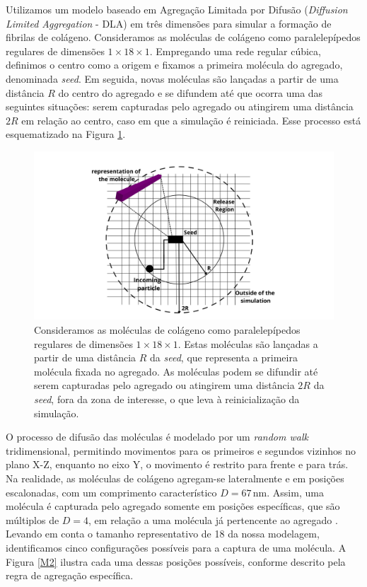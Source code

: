 \documentclass{article}
\begin{document}
    Utilizamos um modelo baseado em Agregação Limitada por Difusão (\textit{Diffusion Limited Aggregation} - DLA) \cite{Witten1983} 
    em três dimensões para simular a formação de fibrilas de colágeno. Consideramos as moléculas de colágeno como paralelepípedos 
    regulares de dimensões \(1 \times 18 \times 1\). Empregando uma rede regular cúbica, definimos o centro como a origem e fixamos 
    a primeira molécula do agregado, denominada \textit{seed}. Em seguida, novas moléculas são lançadas a partir de uma distância 
    \(R\) do centro do agregado e se difundem até que ocorra uma das seguintes situações: serem capturadas pelo agregado ou atingirem 
    uma distância \(2R\) em relação ao centro, caso em que a simulação é reiniciada. Esse processo está esquematizado na Figura \ref{M1}. 

        \begin{figure}[H]
            \centering
            \includegraphics[width=\textwidth]{figures/DLA.png}
    
            \caption{Consideramos as moléculas de colágeno como paralelepípedos regulares de dimensões \(1 \times 18 \times 1\). 
            Estas moléculas são lançadas a partir de uma distância \(R\) da \textit{seed}, que representa a primeira molécula fixada 
            no agregado. As moléculas podem se difundir até serem capturadas pelo agregado ou atingirem uma distância \(2R\) da \textit{seed}, 
            fora da zona de interesse, o que leva à reinicialização da simulação.} 
    
            \label{M1}
        \end{figure}
    
        O processo de difusão das moléculas é modelado por um \textit{random walk} tridimensional, permitindo movimentos para os primeiros e 
        segundos vizinhos no plano X-Z, enquanto no eixo Y, o movimento é restrito para frente e para trás. Na realidade, as moléculas de colágeno 
        agregam-se lateralmente e em posições escalonadas, com um comprimento característico \(D = 67 \, \text{nm}\). Assim, uma molécula é 
        capturada pelo agregado somente em posições específicas, que são múltiplos de \(D = 4\), em relação a uma molécula já pertencente ao 
        agregado \cite{Parkinson1995}. Levando em conta o tamanho representativo de 18 da nossa modelagem, identificamos cinco configurações 
        possíveis para a captura de uma molécula. A Figura \ref{M2} ilustra cada uma dessas posições possíveis, conforme descrito pela regra de 
        agregação específica. 
\end{document}
